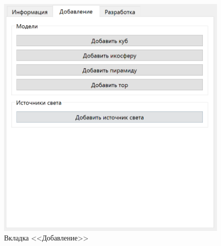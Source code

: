 \begin{figure}[h]
	\centering
	\includegraphics[scale=0.7]{inc/img/add_page.png}
	\caption{Вкладка <<Добавление>>}
	\label{fig:add_page}
\end{figure} 

